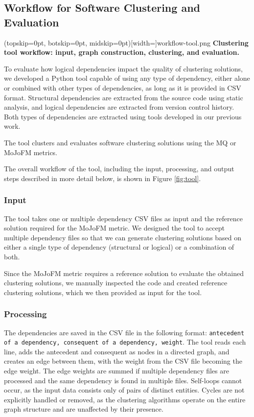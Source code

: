 \documentclass{ieeeaccess}
\begin{document}
\subsection{Workflow for Software Clustering and Evaluation}
\label{subsec:tool_workflow}

\Figure[t!](topskip=0pt, botskip=0pt, midskip=0pt)[width=\textwidth]{workflow-tool.png}
{ \textbf{Clustering tool workflow: input, graph construction, clustering, and evaluation.}\label{fig:tool}}

To evaluate how logical dependencies impact the quality of clustering solutions, we developed a Python tool capable of using any type of dependency, either alone or combined with other types of dependencies, as long as it is provided in CSV format. Structural dependencies are extracted from the source code using static analysis, and logical dependencies are extracted from version control history. Both types of dependencies are extracted using tools developed in our previous work. 

The tool clusters and evaluates software clustering solutions using the MQ or MoJoFM metrics.

The overall workflow of the tool, including the input, processing, and output steps described in more detail below, is shown in Figure \ref{fig:tool}.

\subsubsection{Input}

The tool takes one or multiple dependency CSV files as input and the reference solution required for the MoJoFM metric. We designed the tool to accept multiple dependency files so that we can generate clustering solutions based on either a single type of dependency (structural or logical) or a combination of both.

Since the MoJoFM metric requires a reference solution to evaluate the obtained clustering solutions, we manually inspected the code and created reference clustering solutions, which we then provided as input for the tool.

\subsubsection{Processing}

The dependencies are saved in the CSV file in the following format: \texttt{antecedent of a dependency, consequent of a dependency, weight}. The tool reads each line, adds the antecedent and consequent as nodes in a directed graph, and creates an edge between them, with the weight from the CSV file becoming the edge weight. The edge weights are summed if multiple dependency files are processed and the same dependency is found in multiple files. Self-loops cannot occur, as the input data consists only of pairs of distinct entities. Cycles are not explicitly handled or removed, as the clustering algorithms operate on the entire graph structure and are unaffected by their presence.
\end{document}
